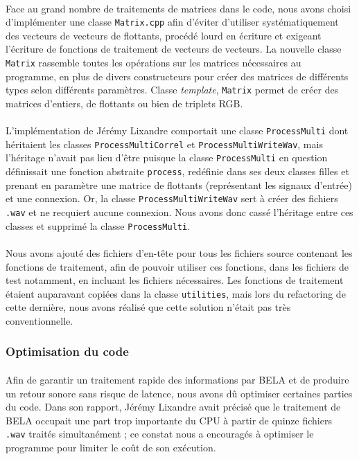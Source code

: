 \paragraph{}
Face au grand nombre de traitements de matrices dans le code, nous
avons choisi d'implémenter une classe \verb!Matrix.cpp! afin d'éviter
d'utiliser systématiquement des vecteurs de vecteurs de flottants,
procédé lourd en écriture et exigeant l'écriture de fonctions de
traitement de vecteurs de vecteurs. La nouvelle classe \verb!Matrix!
rassemble toutes les opérations sur les matrices nécessaires au
programme, en plus de divers constructeurs pour créer des matrices de
différents types selon différents paramètres. Classe
\textit{template}, \verb!Matrix! permet de créer des matrices
d'entiers, de flottants ou bien de triplets RGB.

\paragraph{}
L'implémentation de Jérémy Lixandre comportait une classe
\verb!ProcessMulti! dont héritaient les classes
\verb!ProcessMultiCorrel! et \verb!ProcessMultiWriteWav!, mais
l'héritage n'avait pas lieu d'être puisque la classe
\verb!ProcessMulti! en question définissait une fonction abstraite
\verb!process!, redéfinie dans ses deux classes filles et prenant en
paramètre une matrice de flottants (représentant les signaux d'entrée)
et une connexion. Or, la classe \verb!ProcessMultiWriteWav! sert à
créer des fichiers \verb!.wav! et ne recquiert aucune connexion. Nous
avons donc cassé l'héritage entre ces classes et supprimé la classe
\verb!ProcessMulti!.

\paragraph{}
Nous avons ajouté des fichiers d'en-tête pour tous les fichiers source
contenant les fonctions de traitement, afin de pouvoir utiliser ces
fonctions, dans les fichiers de test notamment, en incluant les fichiers
nécessaires. Les fonctions de traitement étaient auparavant copiées
dans la classe \verb!utilities!, mais lors du refactoring de cette
dernière, nous avons réalisé que cette solution n'était pas très
conventionnelle.


\subsubsection{Optimisation du code}
\paragraph{}
Afin de garantir un traitement rapide des informations par BELA et de
produire un retour sonore sans risque de latence, nous avons dû
optimiser certaines parties du code. Dans son rapport, Jérémy Lixandre
avait précisé que le traitement de BELA occupait une part trop
importante du CPU à partir de quinze fichiers \verb!.wav! traités
simultanément ; ce constat nous a encouragés à optimiser le programme
pour limiter le coût de son exécution.

